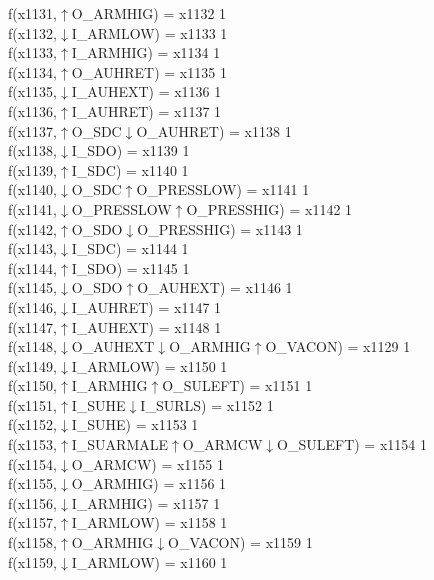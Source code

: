 f(x1131,$\uparrow$O\_ARMHIG) = x1132 {1} \\
f(x1132,$\downarrow$I\_ARMLOW) = x1133 {1} \\
f(x1133,$\uparrow$I\_ARMHIG) = x1134 {1} \\
f(x1134,$\uparrow$O\_AUHRET) = x1135 {1} \\
f(x1135,$\downarrow$I\_AUHEXT) = x1136 {1} \\
f(x1136,$\uparrow$I\_AUHRET) = x1137 {1} \\
f(x1137,$\uparrow$O\_SDC$\downarrow$O\_AUHRET) = x1138 {1} \\
f(x1138,$\downarrow$I\_SDO) = x1139 {1} \\
f(x1139,$\uparrow$I\_SDC) = x1140 {1} \\
f(x1140,$\downarrow$O\_SDC$\uparrow$O\_PRESSLOW) = x1141 {1} \\
f(x1141,$\downarrow$O\_PRESSLOW$\uparrow$O\_PRESSHIG) = x1142 {1} \\
f(x1142,$\uparrow$O\_SDO$\downarrow$O\_PRESSHIG) = x1143 {1} \\
f(x1143,$\downarrow$I\_SDC) = x1144 {1} \\
f(x1144,$\uparrow$I\_SDO) = x1145 {1} \\
f(x1145,$\downarrow$O\_SDO$\uparrow$O\_AUHEXT) = x1146 {1} \\
f(x1146,$\downarrow$I\_AUHRET) = x1147 {1} \\
f(x1147,$\uparrow$I\_AUHEXT) = x1148 {1} \\
f(x1148,$\downarrow$O\_AUHEXT$\downarrow$O\_ARMHIG$\uparrow$O\_VACON) = x1129 {1} \\
f(x1149,$\downarrow$I\_ARMLOW) = x1150 {1} \\
f(x1150,$\uparrow$I\_ARMHIG$\uparrow$O\_SULEFT) = x1151 {1} \\
f(x1151,$\uparrow$I\_SUHE$\downarrow$I\_SURLS) = x1152 {1} \\
f(x1152,$\downarrow$I\_SUHE) = x1153 {1} \\
f(x1153,$\uparrow$I\_SUARMALE$\uparrow$O\_ARMCW$\downarrow$O\_SULEFT) = x1154 {1} \\
f(x1154,$\downarrow$O\_ARMCW) = x1155 {1} \\
f(x1155,$\downarrow$O\_ARMHIG) = x1156 {1} \\
f(x1156,$\downarrow$I\_ARMHIG) = x1157 {1} \\
f(x1157,$\uparrow$I\_ARMLOW) = x1158 {1} \\
f(x1158,$\uparrow$O\_ARMHIG$\downarrow$O\_VACON) = x1159 {1} \\
f(x1159,$\downarrow$I\_ARMLOW) = x1160 {1} \\
